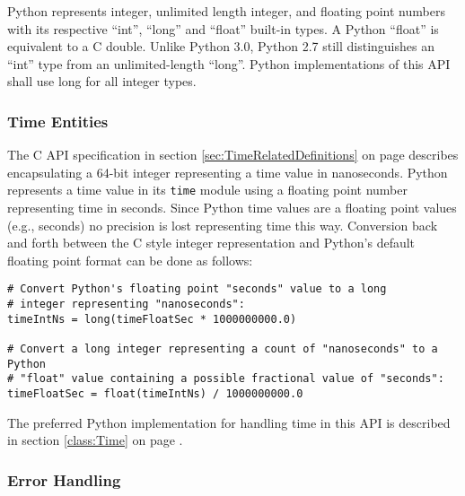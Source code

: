 \documentclass[12pt]{report} %
\providecommand{\DIFaddtex}[1]{{\protect\color{blue}\uwave{#1}}} %
\providecommand{\DIFdeltex}[1]{{\protect\color{red}\sout{#1}}}                      %
\providecommand{\DIFaddbegin}{} %
\providecommand{\DIFaddend}{} %
\providecommand{\DIFdelbegin}{} %
\providecommand{\DIFdelend}{} %
\providecommand{\DIFadd}[1]{\texorpdfstring{\DIFaddtex{#1}}{#1}} %
\providecommand{\DIFdel}[1]{\texorpdfstring{\DIFdeltex{#1}}{}} %
\newcommand{\DIFscaledelfig}{0.5}
\newlength{\DIFdelgraphicswidth} %
\newlength{\DIFdelgraphicsheight} %
\newcommand{\DIFaddincludegraphics}[2][]{{\color{blue}\fbox{\DIFOincludegraphics[#1]{#2}}}} %
\newcommand{\DIFdelincludegraphics}[2][]{%
\sbox{\DIFdelgraphicsbox}{\DIFOincludegraphics[#1]{#2}}%
\settoboxwidth{\DIFdelgraphicswidth}{\DIFdelgraphicsbox} %
\settoboxtotalheight{\DIFdelgraphicsheight}{\DIFdelgraphicsbox} %
\scalebox{\DIFscaledelfig}{%
\parbox[b]{\DIFdelgraphicswidth}{\usebox{\DIFdelgraphicsbox}\\[-\baselineskip] \rule{\DIFdelgraphicswidth}{0em}}\llap{\resizebox{\DIFdelgraphicswidth}{\DIFdelgraphicsheight}{%
\setlength{\unitlength}{\DIFdelgraphicswidth}%
\begin{picture}(1,1)%
\thicklines\linethickness{2pt} %
{\color[rgb]{1,0,0}\put(0,0){\framebox(1,1){}}}%
{\color[rgb]{1,0,0}\put(0,0){\line( 1,1){1}}}%
{\color[rgb]{1,0,0}\put(0,1){\line(1,-1){1}}}%
\end{picture}%
}\hspace*{3pt}}} %
} %
\DeclareRobustCommand{\DIFaddbegin}{\DIFOaddbegin \let\includegraphics\DIFaddincludegraphics} %
\DeclareRobustCommand{\DIFaddend}{\DIFOaddend \let\includegraphics\DIFOincludegraphics} %
\DeclareRobustCommand{\DIFdelbegin}{\DIFOdelbegin \let\includegraphics\DIFdelincludegraphics} %
\DeclareRobustCommand{\DIFdelend}{\DIFOaddend \let\includegraphics\DIFOincludegraphics} %
\begin{document}
\begin{appendices}
Python represents integer, unlimited length integer, and floating point numbers
with its respective ``int'', ``long'' and ``float'' built-in types. A Python
``float'' is equivalent to a C double. Unlike Python 3.0, Python 2.7 still
distinguishes an ``int'' type from an unlimited-length ``long''. Python
implementations of this API shall use long for all integer types.

\subsubsection{Time Entities}\label{sec:PythonTimeEntities}

The C API specification in section \ref{sec:TimeRelatedDefinitions} on page
\pageref{sec:TimeRelatedDefinitions} describes encapsulating a 64-bit integer
representing a time value in nanoseconds. Python represents a time value in its
\texttt{time} module using a floating point number representing time in seconds.
Since Python time values are a floating point values (e.g., \DIFdelbegin \DIFdel{
}\DIFdelend \DIFaddbegin \DIFadd{$13.434582349$
}\DIFaddend seconds) no precision is lost representing time this way. Conversion back and
forth between the C style integer representation and Python's default floating
point format can be done as follows:

\begin{center}\begin{minipage}{.95\linewidth}\begin{lstlisting}
# Convert Python's floating point "seconds" value to a long
# integer representing "nanoseconds":
timeIntNs = long(timeFloatSec * 1000000000.0)

# Convert a long integer representing a count of "nanoseconds" to a Python
# "float" value containing a possible fractional value of "seconds":
timeFloatSec = float(timeIntNs) / 1000000000.0
\end{lstlisting}\end{minipage}\end{center}

The preferred Python implementation for handling time in this API is described
in section \ref{class:Time} on page \pageref{class:Time}.

\subsubsection{Error Handling}\label{sec:PythonErrorHandling}


\end{appendices}
\end{document}
